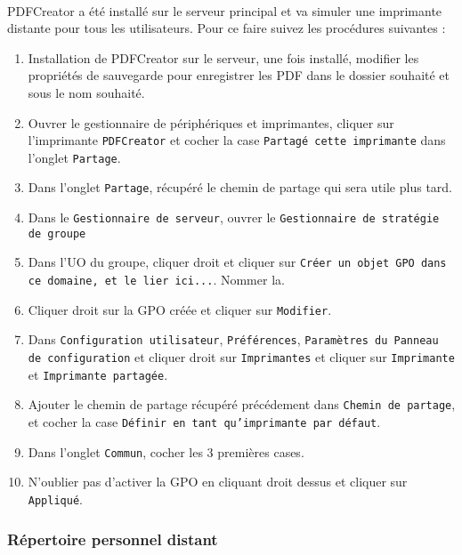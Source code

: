 			\paragraph{}
				PDFCreator a été installé sur le serveur principal et va simuler une imprimante distante pour tous les utilisateurs. Pour ce faire suivez les procédures suivantes : 
				\begin{enumerate}
					\item Installation de PDFCreator sur le serveur, une fois installé, modifier les propriétés de sauvegarde pour enregistrer les PDF dans le dossier souhaité et sous le nom souhaité.
					\item Ouvrer le gestionnaire de périphériques et imprimantes, cliquer sur l'imprimante \texttt{PDFCreator} et cocher la case \texttt{Partagé cette imprimante} dans l'onglet \texttt{Partage}.
					\item Dans l'onglet \texttt{Partage}, récupéré le chemin de partage qui sera utile plus tard.
					\item Dans le \texttt{Gestionnaire de serveur}, ouvrer le \texttt{Gestionnaire de stratégie de groupe}
					\item Dans l'UO du groupe, cliquer droit et cliquer sur \texttt{Créer un objet GPO dans ce domaine, et le lier ici...}. Nommer la. 
					\item Cliquer droit sur la GPO créée et cliquer sur \texttt{Modifier}.
					\item Dans \texttt{Configuration utilisateur}, \texttt{Préférences}, \texttt{Paramètres du Panneau de configuration} et cliquer droit sur \texttt{Imprimantes} et cliquer sur \texttt{Imprimante} et \texttt{Imprimante partagée}.
					\item Ajouter le chemin de partage récupéré précédement dans \texttt{Chemin de partage}, et cocher la case \texttt{Définir en tant qu'imprimante par défaut}.
					\item Dans l'onglet \texttt{Commun}, cocher les 3 premières cases.
					\item N'oublier pas d'activer la GPO en cliquant droit dessus et cliquer sur \texttt{Appliqué}.
				\end{enumerate}


		\subsubsection{Répertoire personnel distant}
